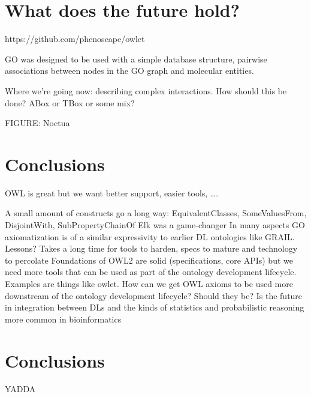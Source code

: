 \documentclass{llncs}
\begin{document}
\section{What does the future hold?}

https://github.com/phenoscape/owlet

GO was designed to be used with a simple database structure, pairwise associations between nodes in the GO graph and molecular entities. 

Where we’re going now: describing complex interactions. How should this be done? ABox or TBox or some mix? 

FIGURE: Noctua

\section{Conclusions}


OWL is great but we want better support, easier tools, ….

A small amount of constructs go a long way: EquivalentClasses, SomeValuesFrom, DisjointWith, SubProperty{Chain}Of
Elk was a game-changer
In many aspects GO axiomatization is of a similar expressivity to earlier DL ontologies like GRAIL. Lessons? Takes a long time for tools to harden, specs to mature and technology to percolate
Foundations of OWL2 are solid (specifications, core APIs) but we need more tools that can be used as part of the ontology development lifecycle. Examples are things like owlet.
How can we get OWL axioms to be used more downstream of the ontology development lifecycle? Should they be? Is the future in integration between DLs and the kinds of statistics and probabilistic reasoning more common in bioinformatics























\section{Conclusions}

YADDA



\end{document}
